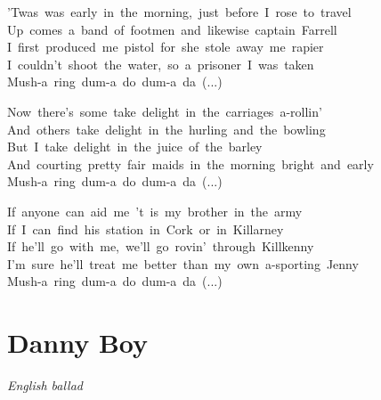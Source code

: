 \documentclass[12pt,a5paper,openany]{memoir}
\newcommand\I[0]{%
  \ignorespaces
}
\newcommand\songtitle[1]{%
  \FloatBlock
  \vfil
  \pagebreak[2]
  \vfilneg
  \section{#1}
}
\newcommand\subtitle[1]{%
  \emph{#1}
}
\begin{document}
\begin{description}[leftmargin=2em,style=nextline,itemsep=1ex]
        \item[4.]'Twas~was~early~in~the~morning,~just~before~I~rose~to~travel\\
        Up~comes~a~band~of~footmen~and~likewise~captain~Farrell\\
        I~first~produced~me~pistol~for~she~stole~away~me~rapier\\
        I~couldn't~shoot~the~water,~so~a~prisoner~I~was~taken\\
        Mush-a~ring~dum-a~do~dum-a~da~(...)
        
        \item[5.]Now~there's~some~take~delight~in~the~carriages~a-rollin'\\
        And~others~take~delight~in~the~hurling~and~the~bowling\\
        But~I~take~delight~in~the~juice~of~the~barley\\
        And~courting~pretty~fair~maids~in~the~morning~bright~and~early\\
        Mush-a~ring~dum-a~do~dum-a~da~(...)
        
        \item[6.]If~anyone~can~aid~me~'t~is~my~brother~in~the~army\\
        If~I~can~find~his~station~in~Cork~or~in~Killarney\\
        If~he'll~go~with~me,~we'll~go~rovin'~through~Killkenny\\
        I'm~sure~he'll~treat~me~better~than~my~own~a-sporting~Jenny\\
        Mush-a~ring~dum-a~do~dum-a~da~(...)
        
  \end{description}
\songtitle{\I Danny Boy}

  
    \begin{center}
    \subtitle{\I English ballad}
    
    \end{center}
  
\end{document}
